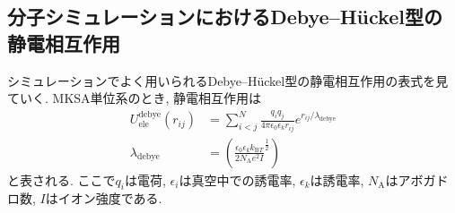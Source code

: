 \subsection{分子シミュレーションにおけるDebye--H\"{u}ckel型の静電相互作用}
シミュレーションでよく用いられるDebye--H\"{u}ckel型の静電相互作用の表式を見ていく.
MKSA単位系のとき, 静電相互作用は
\begin{align}
    U_{\mathrm{ele}}^{\mathrm{debye}} (r_{ij})
    &=
    \sum_{i<j}^{N}
    \frac{q_{i}q_{j}}{4\pi\epsilon_{0}\epsilon_{k}r_{ij}} e^{r_{ij}/\lambda_{\mathrm{debye}}}
    \\
    \lambda_{\mathrm{debye}}
    &=
    \left(
        \frac{\epsilon_{0}\epsilon_{k}k_{\mathrm{B}T}}{2N_{\mathrm{A}}e^{2}I}^{\frac{1}{2}}
    \right)
\end{align}
と表される.
ここで$q_{i}$は電荷, $\epsilon_{i}$は真空中での誘電率, $\epsilon_{k}$は誘電率, $N_{\mathrm{A}}$はアボガドロ数, $I$はイオン強度である.




% 
% 

